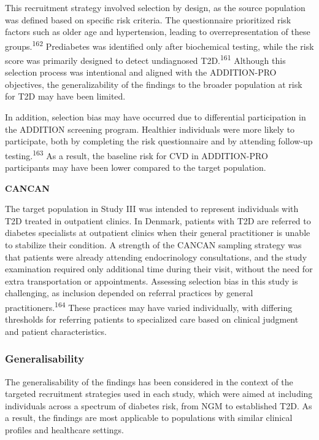 \documentclass[
  a4paper,
  headsepline=true,
  open=left]{scrbook}
\begin{document}
This recruitment strategy involved selection by design, as the source
population was defined based on specific risk criteria. The
questionnaire prioritized risk factors such as older age and
hypertension, leading to overrepresentation of these
groups.\textsuperscript{162} Prediabetes was identified only after
biochemical testing, while the risk score was primarily designed to
detect undiagnosed T2D.\textsuperscript{161} Although this selection
process was intentional and aligned with the ADDITION-PRO objectives,
the generalizability of the findings to the broader population at risk
for T2D may have been limited.

In addition, selection bias may have occurred due to differential
participation in the ADDITION screening program. Healthier individuals
were more likely to participate, both by completing the risk
questionnaire and by attending follow-up testing.\textsuperscript{163}
As a result, the baseline risk for CVD in ADDITION-PRO participants may
have been lower compared to the target population.

\textbf{CANCAN}

The target population in Study III was intended to represent individuals
with T2D treated in outpatient clinics. In Denmark, patients with T2D
are referred to diabetes specialists at outpatient clinics when their
general practitioner is unable to stabilize their condition. A strength
of the CANCAN sampling strategy was that patients were already attending
endocrinology consultations, and the study examination required only
additional time during their visit, without the need for extra
transportation or appointments. Assessing selection bias in this study
is challenging, as inclusion depended on referral practices by general
practitioners.\textsuperscript{164} These practices may have varied
individually, with differing thresholds for referring patients to
specialized care based on clinical judgment and patient characteristics.

\hypertarget{generalisability}{%
\subsubsection{Generalisability}\label{generalisability}}

The generalisability of the findings has been considered in the context
of the targeted recruitment strategies used in each study, which were
aimed at including individuals across a spectrum of diabetes risk, from
NGM to established T2D. As a result, the findings are most applicable to
populations with similar clinical profiles and healthcare settings.
\end{document}
